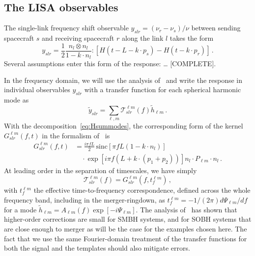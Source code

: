 \documentclass[aps,showpacs,twocolumn,prd,superscriptaddress,nofootinbib]{revtex4-1}
\newcommand{\be}{\begin{equation}}
\newcommand{\ee}{\end{equation}}
\newcommand\calT{{\mathcal{T}}}
\newcommand{\nn}{\nonumber}
\newcommand{\sinc}{\,\mathrm{sinc}}
\newcommand{\SM}[1]{{\color{Blue} #1}}
\begin{document}

\subsection{The LISA observables}
\label{sec:LISAobservables}

The single-link frequency shift observable $y_{slr} = (\nu_{r} - \nu_{s})/\nu$ between sending spacecraft $s$ and receiving spacecraft $r$ along the link $l$ takes the form 
\be\label{eq:defyslr}
	y_{slr} = \frac{1}{2} \frac{n_{l} \otimes n_{l}}{1 - k\cdot n_{l}} : \left[ H(t - L - k\cdot p_{s}) - H(t - k\cdot p_{r}) \right] \,.
\ee
Several assumptions enter this form of the response: \dots \SM{[COMPLETE]}.

In the frequency domain, we will use the analysis of~\cite{} and write the response in individual observables $y_{slr}$ with a transfer function for each spherical harmonic mode as
\be
	\tilde{y}_{slr} = \sum_{\ell, m}\calT_{slr}^{\ell m}(f) \tilde{h}_{\ell m} \,.
\ee
With the decomposition~\eqref{eq:Hsummodes}, the corresponding form of the kernel $G^{\ell m}_{slr}(f, t)$ in the formalism of~\cite{} is
\begin{align}\label{eq:Gslr}
	G_{slr}^{\ell m}(f,t) &= \frac{i \pi f L}{2} \sinc \left[ \pi f L\left(1-k\cdot n_{l} \right) \right] \nn\\
	& \quad \cdot \exp\left[ i \pi f \left( L + k\cdot \left( p_{1} + p_{2} \right) \right) \right]  n_{l} \cdot P_{\ell m} \cdot n_{l} \,.
\end{align}
At leading order in the separation of timescales, we have simply
\be
	\calT_{slr}^{\ell m}(f) = G_{slr}^{\ell m}(f, t_{f}^{\ell m}) \,,
\ee
with $t_{f}^{\ell m}$ the effective time-to-frequency correspondence, defined across the whole frequency band, including in the merger-ringdown, as $t_{f}^{\ell m} = -1/(2\pi) d\Psi_{\ell m} / df$ for a mode $\tilde{h}_{\ell m} = A_{\ell m}(f) \exp\left[-i \Psi_{\ell m}\right]$. The analysis of~\cite{} has shown that higher-order corrections are small for SMBH systems, and for SOBH systems that are close enough to merger as will be the case for the examples chosen here. The fact that we use the same Fourier-domain treatment of the transfer functions for both the signal and the templates should also mitigate errors. 
\end{document}
